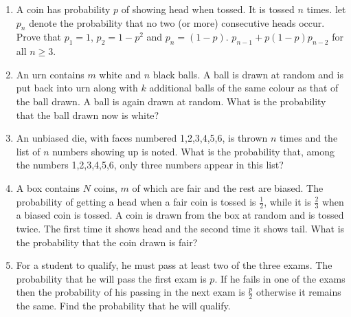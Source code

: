 \documentclass[journal,12pt,onecolumn]{IEEEtran}
\theoremstyle{remark}
\begin{document}
\begin{enumerate}
\hfill{}

\item A coin has probability $p$ of showing head when tossed. It is tossed $n$ times. let $p_{n}$ denote the probability that no two (or more) consecutive heads occur. Prove that $p_{1}=1$, $p_{2}=1-p^2$ and $p_{n}=(1-p)$. $p_{n-1}+p(1-p)p_{n-2}$ for all $n \geq 3$. 

\hfill{}

\item An urn contains $m$ white and $n$ black balls. A ball is drawn at random and is put back into urn along with $k$ additional balls of the same colour as that of the ball drawn. A ball is again drawn at random. What is the probability that the ball drawn now is white?

\hfill{}

\item An unbiased die, with faces numbered 1,2,3,4,5,6, is thrown $n$ times and the list of $n$ numbers showing up is noted. What is the probability that, among the numbers 1,2,3,4,5,6, only three numbers appear in this list?

\hfill{}

\item A box contains $N$ coins, $m$ of which are fair and the rest are biased. The probability of getting a head when a fair coin is tossed is $\frac{1}{2}$, while it is $\frac{2}{3}$ when a biased coin is tossed. A coin is drawn from the box at random and is tossed twice. The first time it shows head and the second time it shows tail. What is the probability that the coin drawn is fair?

\hfill{}

\item For a student to qualify, he must pass at least two of the three exams. The probability that he will pass the first exam is $p$. If he fails in one of the exams then the probability of his passing in the next exam is $\frac{p}{2}$ otherwise it remains the same. Find the probability that he will qualify.

\hfill{}
\end{enumerate}
\end{document}

